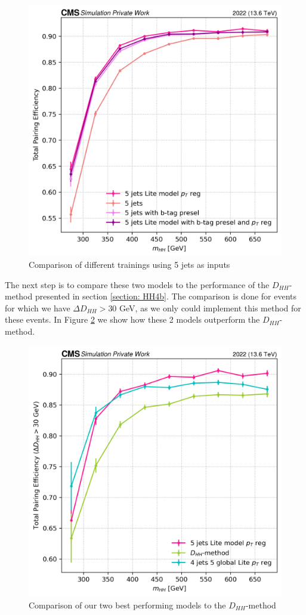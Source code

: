 \begin{figure}[h!]
    \centering
    \includegraphics[width=0.6\linewidth]{Images/6.Improving/Imput Comparisons/5j training comp.png}
    \caption{Comparison of different trainings using 5 jets as inputs}
    \label{fig: comp 5j}
\end{figure}



The next step is to compare these two models to the performance of the $D_{HH}$-method presented in section \ref{section: HH4b}. The comparison is done for events for which we have $\Delta D_{HH} > 30$ GeV, as we only could implement this method for these events. In Figure \ref{fig: 2 best models comp} we show how these 2 models outperform the $D_{HH}$-method. 

\begin{figure}[h!]
    \centering
    \includegraphics[width=0.6\linewidth]{Images/6.Improving/Imput Comparisons/2 best models comp run2 .png}
    \caption{Comparison of our two best performing models to the $D_{HH}$-method}
    \label{fig: 2 best models comp}
\end{figure}

